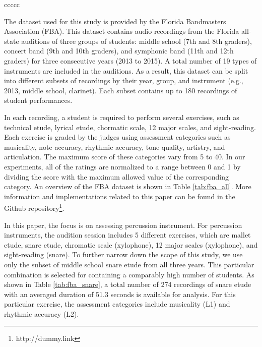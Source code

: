 \documentclass{article}
\begin{document}
\begin{table}[]
\begin{tabular}{ccccc}
 \\ \hline
\end{tabular}
\caption{An overview of numbers of student recordings in FBA dataset from 2013 to 2015}
\label{tab:fba_all}
\end{table}

The dataset used for this study is provided by the Florida Bandmasters Association (FBA). This dataset contains audio recordings from the Florida all-state auditions of three groups of students: middle school (7th and 8th graders), concert band (9th and 10th graders), and symphonic band (11th and 12th graders) for three consecutive years (2013 to 2015). A total number of 19 types of instruments are included in the auditions. As a result, this dataset can be split into different subsets of recordings by their year, group, and instrument (e.g., 2013, middle school, clarinet). Each subset contains up to 180 recordings of student performances.  

In each recording, a student is required to perform several exercises, such as technical etude, lyrical etude, chormatic scale, 12 major scales, and sight-reading. Each exercise is graded by the judges using assessment categories such as musicality, note accuracy, rhythmic accuracy, tone quality, artistry, and articulation. The maximum score of these categories vary from 5 to 40. In our experiments, all of the ratings are normalized to a range between 0 and 1 by dividing the score with the maximum allowed value of the corresponding category. An overview of the FBA dataset is shown in Table \ref{tab:fba_all}. More information and implementations related to this paper can be found in the Github repository\footnote{http://dummy.link}.  

In this paper, the focus is on assessing percussion instrument. For percussion instruments, the audition session includes 5 different exercises, which are mallet etude, snare etude, chromatic scale (xylophone), 12 major scales (xylophone), and sight-reading (snare). To further narrow down the scope of this study, we use only the subset of middle school snare etude from all three years. This particular combination is selected for containing a comparably high number of students. As shown in Table \ref{tab:fba_snare}, a total number of 274 recordings of snare etude with an averaged duration of 51.3 seconds is available for analysis. For this particular exercise, the assessment categories include musicality (L1) and rhythmic accuracy (L2).
\end{document}
